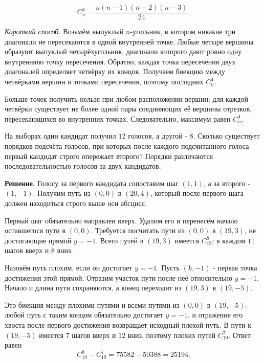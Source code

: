 \begin{problems}
\[
\boxed{C_n^4=\frac{n(n-1)(n-2)(n-3)}{24}}.
\]\par
\par\textit{Короткий способ.} Возьмём выпуклый $n$-угольник, в котором никакие три диагонали не пересекаются в одной внутренней точке. Любые четыре вершины образуют выпуклый четырёхугольник, диагонали которого дают ровно одну внутреннюю точку пересечения. Обратно, каждая точка пересечения двух диагоналей определяет четвёрку их концов. Получаем биекцию между четвёрками вершин и точками пересечения, поэтому последних $C_n^4$.
\par Больше точек получить нельзя при любом расположении вершин: для каждой четвёрки существует не более одной пары соединяющих её вершины отрезков, пересекающихся во внутренних точках. Следовательно, максимум равен $C_n^4$.\par

\item На выборах один кандидат получил $12$ голосов, а другой - $8$. Сколько существует порядков подсчёта голосов, при которых после каждого подсчитанного голоса первый кандидат строго опережает второго? Порядки различаются последовательностью голосов за двух кандидатов.
\par\smallskip\noindent\textbf{Решение.} Голосу за первого кандидата сопоставим шаг $(1,1)$, а за второго - $(1,-1)$. Получим путь из $(0,0)$ в $(20,4)$, который после первого шага должен находиться строго выше оси абсцисс.
\par Первый шаг обязательно направлен вверх. Удалим его и перенесём начало оставшегося пути в $(0,0)$. Требуется посчитать пути из $(0,0)$ в $(19,3)$, не достигающие прямой $y=-1$. Всего путей в $(19,3)$ имеется $C_{19}^{8}$: в каждом $11$ шагов вверх и $8$ вниз.
\par Назовём путь плохим, если он достигает $y=-1$. Пусть $(k,-1)$ - первая точка достижения этой прямой. Отразим участок пути после неё относительно $y=-1$. Начало и длина пути сохраняются, а конец переходит из $(19,3)$ в $(19,-5)$.
\par Это биекция между плохими путями и всеми путями из $(0,0)$ в $(19,-5)$: любой путь с таким концом обязательно достигает $y=-1$, и отражение его хвоста после первого достижения возвращает исходный плохой путь. В пути к $(19,-5)$ имеется $7$ шагов вверх и $12$ вниз, поэтому плохих путей $C_{19}^{7}$. Ответ равен
\[
C_{19}^{8}-C_{19}^{7}=75582-50388=25194.
\]\par


\end{problems}
